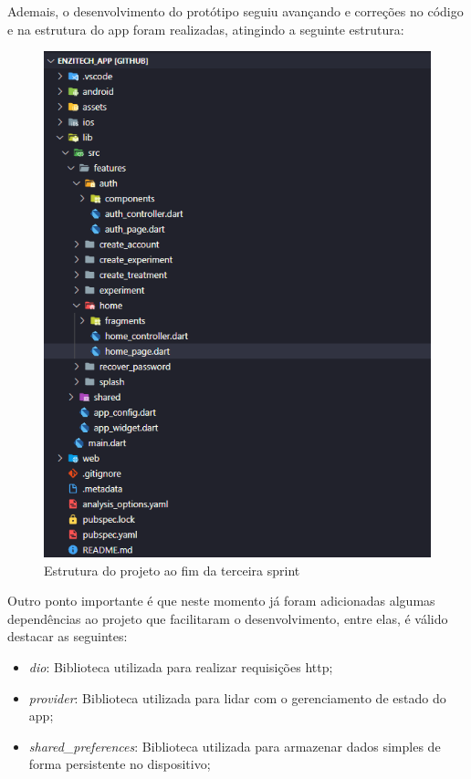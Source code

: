 Ademais, o desenvolvimento do protótipo seguiu avançando e correções no código e na estrutura do \ac{app} foram realizadas, atingindo a seguinte estrutura:
\begin{figure}[H]
\centering
  \includegraphics[width=\columnwidth/2]{images/app_sprint_3.png}
  \caption{Estrutura do projeto ao fim da terceira sprint}
  \label{fig:app_sprint_3}
\end{figure}

Outro ponto importante é que neste momento já foram adicionadas algumas dependências ao projeto que facilitaram o desenvolvimento, entre elas, é válido destacar as seguintes:
\begin{itemize}
   \item \textit{dio}: Biblioteca utilizada para realizar requisições \ac{http};
   \item \textit{provider}: Biblioteca utilizada para lidar com o gerenciamento de estado do \ac{app};
   \item \textit{shared\_preferences}: Biblioteca utilizada para armazenar dados simples de forma persistente no dispositivo;
 \end{itemize}

